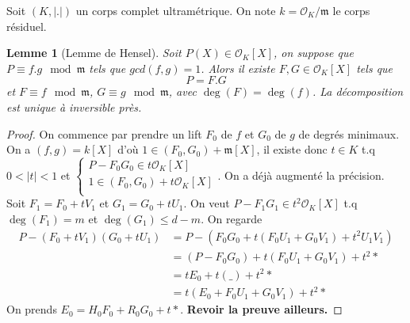 \documentclass[a4paper,12pt]{book}
\newcommand{\Or}{\mathcal{O}}
\newcommand{\m}{\mathfrak m}
\theoremstyle{plain}
\newtheorem{lem}[subsection]{Lemme}
\theoremstyle{definition}
\theoremstyle{remark}
\begin{document}
Soit $(K,|.|)$ un corps complet ultramétrique. On note $k=\Or_K/\m$
le corps résiduel. 
\begin{lem}[Lemme de Hensel]
    Soit $P(X)\in \Or_K[X]$, on suppose que $P\equiv f.g\mod \m$ tels que
    $gcd(f,g)=1$. Alors il existe $F,G\in \Or_K[X]$ tels que 
    \[P=F.G\]
    et $F\equiv f\mod \m$, $G\equiv g\mod\m$, avec $\deg(F)=\deg(f)$.
    La décomposition est unique à inversible près.
\end{lem}
\begin{proof}
    On commence par prendre un lift $F_0$ de $f$ et $G_0$ de $g$ de 
    degrés minimaux. On a $(f,g )=k[X]$ d'où $1\in (F_0,G_0)+\m[X]$,
    il existe donc $t\in K$ t.q $0<|t|<1$ et
    $
    \begin{cases}
        P-F_0G_0\in t\Or_K[X]\\
        1\in (F_0,G_0)+t\Or_K[X]\\
    \end{cases}
    $. On a déjà augmenté la précision. Soit $F_1=F_0+tV_1$ et 
    $G_1=G_0+tU_1$. On veut $P-F_1G_1\in t^2 \Or_K[X]$ t.q $\deg(F_1)=m$
    et $\deg(G_1)\leq d-m$. On regarde 
    \begin{align*}
        P-(F_0+tV_1)(G_0+tU_1)&=P-(F_0G_0+t(F_0U_1+G_0V_1)+t^2U_1V_1)\\
                              &=(P-F_0G_0)+t(F_0U_1+G_0V_1)+t^2*\\
                              &=tE_0+t(\_)+t^2*\\
                              &=t(E_0+F_0U_1+G_0V_1)+t^2*
    \end{align*}
    On prends $E_0=H_0F_0+R_0G_0+t*$.
    \textbf{Revoir la preuve ailleurs.}
\end{proof}




\printbibliography
\end{document}
